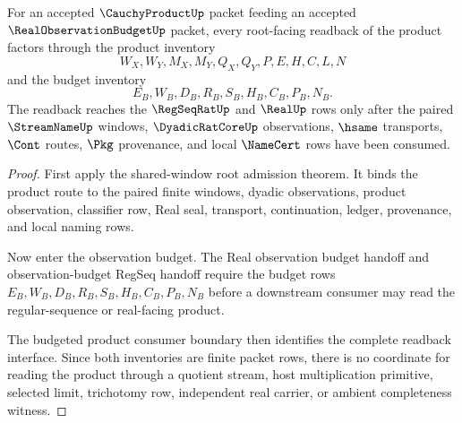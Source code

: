 \begin{theorem}
\label{thm:cauchy-product-budgeted-readback-root-boundary}
For an accepted $\CauchyProductUp$ packet feeding an accepted $\RealObservationBudgetUp$ packet, every root-facing readback of the product factors through the product inventory
$$
W_X,W_Y,M_X,M_Y,Q_X,Q_Y,P,E,H,C,L,N
$$
and the budget inventory
$$
E_B,W_B,D_B,R_B,S_B,H_B,C_B,P_B,N_B.
$$
The readback reaches the $\RegSeqRatUp$ and $\RealUp$ rows only after the paired $\StreamNameUp$ windows, $\DyadicRatCoreUp$ observations, $\hsame$ transports, $\Cont$ routes, $\Pkg$ provenance, and local $\NameCert$ rows have been consumed.
\end{theorem}
\begin{proof}
First apply the shared-window root admission theorem. It binds the product route to the paired finite windows, dyadic observations, product observation, classifier row, Real seal, transport, continuation, ledger, provenance, and local naming rows.

Now enter the observation budget. The Real observation budget handoff and observation-budget RegSeq handoff require the budget rows $E_B,W_B,D_B,R_B,S_B,H_B,C_B,P_B,N_B$ before a downstream consumer may read the regular-sequence or real-facing product.

The budgeted product consumer boundary then identifies the complete readback interface. Since both inventories are finite packet rows, there is no coordinate for reading the product through a quotient stream, host multiplication primitive, selected limit, trichotomy row, independent real carrier, or ambient completeness witness.
\end{proof}

